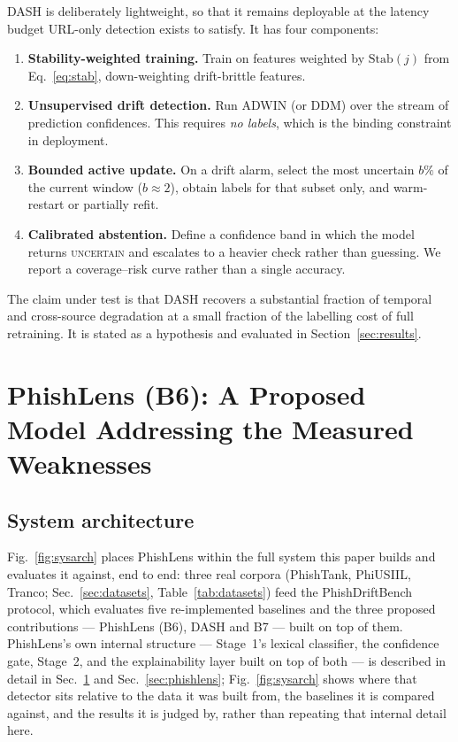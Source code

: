 \documentclass[conference]{IEEEtran}
\begin{document}
DASH is deliberately lightweight, so that it remains deployable at the latency
budget URL-only detection exists to satisfy. It has four components:

\begin{enumerate}
\item \textbf{Stability-weighted training.} Train on features weighted by
      $\mathrm{Stab}(j)$ from Eq.~\eqref{eq:stab}, down-weighting drift-brittle
      features.
\item \textbf{Unsupervised drift detection.} Run ADWIN (or DDM) over the stream
      of prediction confidences. This requires \emph{no labels}, which is the
      binding constraint in deployment.
\item \textbf{Bounded active update.} On a drift alarm, select the most
      uncertain $b\%$ of the current window ($b \approx 2$), obtain labels for
      that subset only, and warm-restart or partially refit.
\item \textbf{Calibrated abstention.} Define a confidence band in which the
      model returns \textsc{uncertain} and escalates to a heavier check rather
      than guessing. We report a coverage--risk curve rather than a single
      accuracy.
\end{enumerate}

The claim under test is that DASH recovers a substantial fraction of temporal
and cross-source degradation at a small fraction of the labelling cost of full
retraining. It is stated as a hypothesis and evaluated in
Section~\ref{sec:results}.

\section{PhishLens (B6): A Proposed Model Addressing the Measured Weaknesses}
\label{sec:b6-method}

\subsection{System architecture}
\label{sec:sysarch}

Fig.~\ref{fig:sysarch} places PhishLens within the full system this paper
builds and evaluates it against, end to end: three real corpora
(PhishTank, PhiUSIIL, Tranco; Sec.~\ref{sec:datasets},
Table~\ref{tab:datasets}) feed the PhishDriftBench protocol, which
evaluates five re-implemented baselines and the three proposed
contributions --- PhishLens (B6), DASH and B7 --- built on top of them.
PhishLens's own internal structure ---
Stage~1's lexical classifier, the confidence gate, Stage~2, and the
explainability layer built on top of both --- is described in detail in
Sec.~\ref{sec:b6-method} and Sec.~\ref{sec:phishlens}; Fig.~\ref{fig:sysarch}
shows where that detector sits relative to the data it was built from,
the baselines it is compared against, and the results it is judged by,
rather than repeating that internal detail here.
\end{document}
